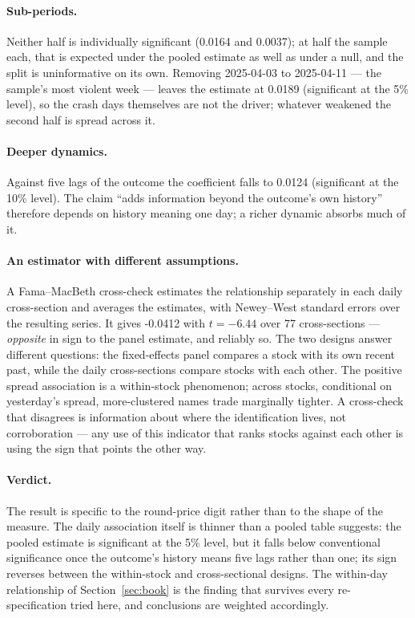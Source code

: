 \paragraph{Sub-periods.} Neither half is individually significant (0.0164 and 0.0037); at half the sample each, that is expected under the pooled estimate as well as under a null, and the split is uninformative on its own. Removing 2025-04-03 to 2025-04-11 --- the sample's most violent week --- leaves the estimate at 0.0189 (significant at the 5\% level), so the crash days themselves are not the driver; whatever weakened the second half is spread across it.

\paragraph{Deeper dynamics.} Against five lags of the outcome the coefficient falls to 0.0124 (significant at the 10\% level). The claim ``adds information beyond the outcome's own history'' therefore depends on history meaning one day; a richer dynamic absorbs much of it.

\paragraph{An estimator with different assumptions.}
A Fama--MacBeth cross-check \parencite{FamaMacBeth1973} estimates the
relationship separately in each daily cross-section and averages the estimates,
with Newey--West standard errors \parencite{NeweyWest1987} over the
resulting series. It gives -0.0412 with $t = -6.44$ over 77 cross-sections --- \emph{opposite} in sign to the panel estimate, and reliably so. The two designs answer different questions: the fixed-effects panel compares a stock with its own recent past, while the daily cross-sections compare stocks with each other. The positive spread association is a within-stock phenomenon; across stocks, conditional on yesterday's spread, more-clustered names trade marginally tighter. A cross-check that disagrees is information about where the identification lives, not corroboration --- any use of this indicator that ranks stocks against each other is using the sign that points the other way.

\paragraph{Verdict.}
The result is specific to the round-price digit rather than to the shape of the measure. The daily association itself is thinner than a pooled table suggests: the pooled estimate is significant at the 5\% level, but it falls below conventional significance once the outcome's history means five lags rather than one; its sign reverses between the within-stock and cross-sectional designs. The within-day relationship of Section~\ref{sec:book} is the finding that survives every re-specification tried here, and conclusions are weighted accordingly.

